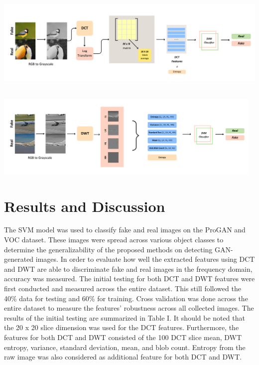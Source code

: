 \documentclass[journal]{./IEEE/IEEEtran}
\begin{document}
\begin{strip} %
\includegraphics[height=5cm,width=\linewidth]{imgs/1.png}
\label{Fig:image label}
\end{strip} 


\begin{strip} %
\includegraphics[height=4cm,width=\linewidth]{imgs/2.png}
\label{Fig:image label}
\end{strip} 



\section{Results and Discussion}

The SVM model was used to classify fake and real images on the ProGAN and VOC dataset. These images were spread across various object classes to determine the generalizability of the proposed methods on detecting GAN-generated images. In order to evaluate how well the extracted features using DCT and DWT are able to discriminate fake and real images in the frequency domain, accuracy was measured. The initial testing for both DCT and DWT features were first conducted and measured across the entire dataset. This still followed the 40\% data for testing and 60\% for training. Cross validation was done across the entire dataset to measure the features' robustness across all collected images. The results of the initial testing are summarized in Table I. It should be noted that the 20 x 20 slice dimension was used for the DCT features. Furthermore, the features for both DCT and DWT consisted of the 100 DCT slice mean, DWT entropy, variance, standard deviation, mean, and blob count. Entropy from the raw image was also considered as additional feature for both DCT and DWT. 
\end{document}
